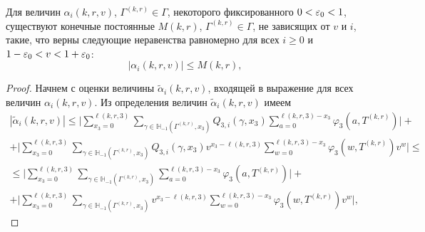 \documentclass{report}
\begin{document}
\begin{lemma}
Для величин $\alpha_i(k,r,v)$, $\Gamma^{(k,r)} \in \Gamma$, некоторого фиксированного $0 \hm< \varepsilon_0 < 1$, существуют конечные постоянные $M(k,r)$, $\Gamma^{(k,r)}\in \Gamma$, не зависящих от $v$ и $i$, такие, что верны следующие неравенства равномерно для всех $i \geqslant 0$ и $ 1-\varepsilon_0 < v \hm< 1  + \varepsilon_0$:
\begin{equation}
|\alpha_i(k,r,v)| \leqslant M(k,r),
\end{equation}

\end{lemma}
\begin{proof}
Начнем с оценки величины $\tilde{\alpha}_i(k,r,v)$, входящей в выражение для всех величин $\alpha_i(k,r,v)$. Из определения величин $\tilde{\alpha}_i(k,r,v)$ имеем 
\begin{multline*}
|\tilde{\alpha}_i(k,r,v) | 
\leqslant
\biggl| \sum_{x_3=0}^{\ell(k,r,3)}\sum_{\gamma \in {\mathbb H}_{-1}(\Gamma^{(k,r)},x_3)} Q_{3,i}(\gamma,x_3) \sum_{a=0}^{\ell(k,r,3) - x_3} \varphi_3(a,T^{(k,r)}) \biggr| +  \\
+ \biggl| \sum_{x_3=0}^{\ell(k,r,3)}  \sum_{\gamma \in {\mathbb H}_{-1}(\Gamma^{(k,r)},x_3)} Q_{3,i}(\gamma,x_3) v^{x_3-\ell(k,r,3)}  \sum_{w=0}^{\ell(k,r,3) -x_3}
\varphi_3(w,T^{(k,r)}) v^w\biggr| \leqslant\\
\leqslant
\biggl| \sum_{x_3=0}^{\ell(k,r,3)}\sum_{\gamma \in {\mathbb H}_{-1}(\Gamma^{(k,r)},x_3)}  \sum_{a=0}^{\ell(k,r,3) - x_3} \varphi_3(a,T^{(k,r)}) \biggr| +  \\
+ \biggl| \sum_{x_3=0}^{\ell(k,r,3)}  \sum_{\gamma \in {\mathbb H}_{-1}(\Gamma^{(k,r)},x_3)}  v^{x_3-\ell(k,r,3)}  \sum_{w=0}^{\ell(k,r,3) -x_3}
\varphi_3(w,T^{(k,r)}) v^w\biggr|,

\end{multline*}
\end{proof}
\end{document}
